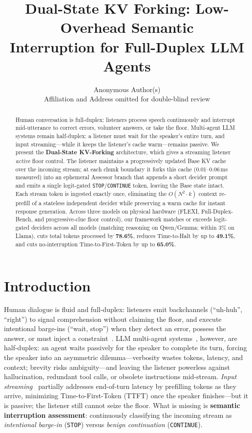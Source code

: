 \documentclass{article}
\title{Dual-State KV Forking: Low-Overhead Semantic \\ Interruption for Full-Duplex LLM Agents}
\author{%
  Anonymous Author(s) \\
  Affiliation and Address omitted for double-blind review \\
}
\begin{document}
\maketitle

\begin{abstract}
Human conversation is full-duplex: listeners process speech continuously and interrupt mid-utterance to correct errors, volunteer answers, or take the floor. Multi-agent LLM systems remain half-duplex: a listener must wait for the speaker's entire turn, and input streaming---while it keeps the listener's cache warm---remains passive. We present the \textbf{Dual-State KV-Forking} architecture, which gives a streaming listener \emph{active} floor control. The listener maintains a progressively updated Base KV cache over the incoming stream; at each chunk boundary it forks this cache (0.01--0.06\,ms measured) into an ephemeral Assessor branch that appends a short decider prompt and emits a single logit-gated \texttt{STOP}/\texttt{CONTINUE} token, leaving the Base state intact. Each stream token is ingested exactly once, eliminating the $O(N^2 \cdot k)$ context re-prefill of a stateless independent decider while preserving a warm cache for instant response generation. Across three models on physical hardware (FLEXI, Full-Duplex-Bench, and progressive-clue floor control), our framework matches or exceeds logit-gated deciders across all models (matching reasoning on Qwen/Gemma; within 3\% on Llama), cuts total tokens processed by \textbf{78.6\%}, reduces Time-to-Halt by up to \textbf{49.1\%}, and cuts no-interruption Time-to-First-Token by up to \textbf{65.0\%}.
\end{abstract}

\section{Introduction}
\label{sec:intro}

Human dialogue is fluid and full-duplex: listeners emit backchannels (``uh-huh'', ``right'') to signal comprehension without claiming the floor, and execute intentional barge-ins (``wait, stop'') when they detect an error, possess the answer, or must inject a constraint~\citep{sacks1974turntaking, yngve1970, skantze2021review}. LLM multi-agent systems~\citep{wu2023autogen, li2023camel}, however, are half-duplex: an agent waits passively for the speaker to complete its turn, forcing the speaker into an asymmetric dilemma---verbosity wastes tokens, latency, and context; brevity risks ambiguity---and leaving the listener powerless against hallucination, redundant tool calls, or obsolete instructions mid-stream. \emph{Input streaming}~\citep{xiao2023streamingllm, agrawal2023sarathi} partially addresses end-of-turn latency by prefilling tokens as they arrive, minimizing Time-to-First-Token (TTFT) once the speaker finishes---but it is passive; the listener still cannot seize the floor. What is missing is \textbf{semantic interruption assessment}: continuously classifying the incoming stream as \emph{intentional barge-in} (\texttt{STOP}) versus \emph{benign continuation} (\texttt{CONTINUE}).
\end{document}
